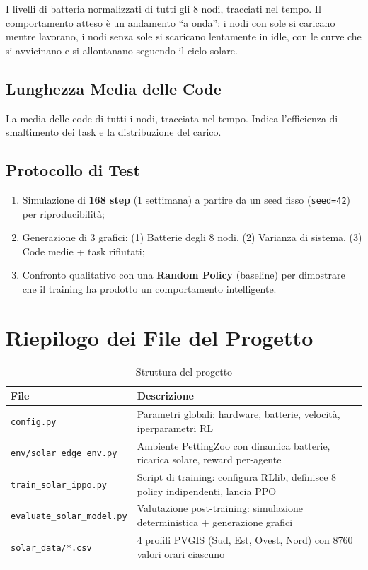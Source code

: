 \documentclass[11pt,a4paper]{article}
\begin{document}
I livelli di batteria normalizzati di tutti gli 8 nodi, tracciati nel tempo. Il comportamento atteso \`e un andamento ``a onda'': i nodi con sole si caricano mentre lavorano, i nodi senza sole si scaricano lentamente in idle, con le curve che si avvicinano e si allontanano seguendo il ciclo solare.

\subsection{Lunghezza Media delle Code}

La media delle code di tutti i nodi, tracciata nel tempo. Indica l'efficienza di smaltimento dei task e la distribuzione del carico.

\subsection{Protocollo di Test}

\begin{enumerate}[nosep]
    \item Simulazione di \textbf{168 step} (1 settimana) a partire da un seed fisso (\texttt{seed=42}) per riproducibilit\`a;
    \item Generazione di 3 grafici: (1) Batterie degli 8 nodi, (2) Varianza di sistema, (3) Code medie + task rifiutati;
    \item Confronto qualitativo con una \textbf{Random Policy} (baseline) per dimostrare che il training ha prodotto un comportamento intelligente.
\end{enumerate}

\section{Riepilogo dei File del Progetto}

\begin{table}[h]
\centering
\caption{Struttura del progetto}
\begin{tabularx}{\textwidth}{@{}lX@{}}
\toprule
\textbf{File} & \textbf{Descrizione} \\
\midrule
\texttt{config.py} & Parametri globali: hardware, batterie, velocit\`a, iperparametri RL \\
\texttt{env/solar\_edge\_env.py} & Ambiente PettingZoo con dinamica batterie, ricarica solare, reward per-agente \\
\texttt{train\_solar\_ippo.py} & Script di training: configura RLlib, definisce 8 policy indipendenti, lancia PPO \\
\texttt{evaluate\_solar\_model.py} & Valutazione post-training: simulazione deterministica + generazione grafici \\
\texttt{solar\_data/*.csv} & 4 profili PVGIS (Sud, Est, Ovest, Nord) con 8760 valori orari ciascuno \\
\bottomrule
\end{tabularx}
\end{table}
\end{document}
